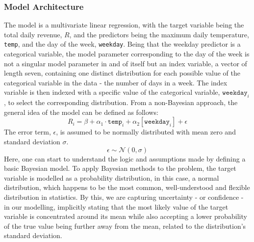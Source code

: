 \subsubsection{Model Architecture}
The model is a multivariate linear regression, with the target variable being
the total daily revenue, $R$, and the predictors being the maximum daily
temperature, \texttt{temp}, and the day of the week, \texttt{weekday}. Being
that the weekday predictor is a categorical variable, the model parameter
corresponding to the day of the week is not a singular model parameter in and
of itself but an index variable, a vector of length seven, containing one
distinct distribution for each possible value of the categorical variable in the
data - the number of days in a week. The index variable is then indexed with a
specific value of the categorical variable, $\texttt{weekday}_i$, to select the
corresponding distribution. From a non-Bayesian approach, the general idea of
the model can be defined as follows:
\begin{equation}
  \label{eq:temp_model_standard}
  R_i = \beta + \alpha_1 \cdot \texttt{temp}_i + \alpha_2[\texttt{weekday}_i] + \epsilon
\end{equation}
The error term, $\epsilon$, is assumed to be normally distributed with mean 
zero and standard deviation $\sigma$. 
\begin{equation}
  \label{eq:error}
  \epsilon \sim \mathcal{N}(0, \sigma)
\end{equation}
Here, one can start to understand the logic and assumptions made by
defining a basic Bayesian model. To apply Bayesian methods to the problem, the
target variable is modelled as a probability distribution, in this case, a
normal distribution, which happens to be the most common, well-understood and
flexible distribution in statistics. By this, we are capturing uncertainty -
or confidence - in our modelling, implicitly stating that the most likely value
of the target variable is concentrated around its mean while also accepting a lower
probability of the true value being further away from the mean, related to
the distribution's standard deviation.

